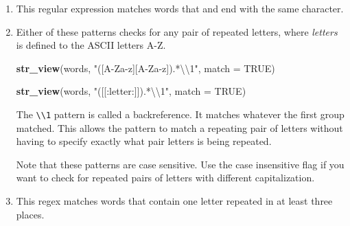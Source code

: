 \documentclass[]{book}
\newenvironment{Shaded}{\begin{snugshade}}{\end{snugshade}}
\newcommand{\CharTok}[1]{\textcolor[rgb]{0.31,0.60,0.02}{#1}}
\newcommand{\DataTypeTok}[1]{\textcolor[rgb]{0.13,0.29,0.53}{#1}}
\newcommand{\KeywordTok}[1]{\textcolor[rgb]{0.13,0.29,0.53}{\textbf{#1}}}
\newcommand{\NormalTok}[1]{#1}
\newcommand{\OperatorTok}[1]{\textcolor[rgb]{0.81,0.36,0.00}{\textbf{#1}}}
\newcommand{\OtherTok}[1]{\textcolor[rgb]{0.56,0.35,0.01}{#1}}
\newcommand{\StringTok}[1]{\textcolor[rgb]{0.31,0.60,0.02}{#1}}
\theoremstyle{plain}
\theoremstyle{remark}
\begin{document}
\begin{enumerate}
\def\labelenumi{\arabic{enumi}.}
\item
  This regular expression matches words that and end with the same
  character.

\begin{Shaded}
\end{Shaded}
\item
  Either of these patterns checks for any pair of repeated letters,
  where \emph{letters} is defined to the ASCII letters A-Z.

\begin{Shaded}
\begin{Highlighting}[]
\KeywordTok{str_view}\NormalTok{(words, }\StringTok{"([A-Za-z][A-Za-z]).*}\CharTok{\textbackslash{}\textbackslash{}}\StringTok{1"}\NormalTok{, }\DataTypeTok{match =} \OtherTok{TRUE}\NormalTok{)}
\end{Highlighting}
\end{Shaded}

\begin{Shaded}
\begin{Highlighting}[]
\KeywordTok{str_view}\NormalTok{(words, }\StringTok{"([[:letter:]]).*}\CharTok{\textbackslash{}\textbackslash{}}\StringTok{1"}\NormalTok{, }\DataTypeTok{match =} \OtherTok{TRUE}\NormalTok{)}
\end{Highlighting}
\end{Shaded}

  The \texttt{\textbackslash{}\textbackslash{}1} pattern is called a
  backreference. It matches whatever the first group matched. This
  allows the pattern to match a repeating pair of letters without having
  to specify exactly what pair letters is being repeated.

  Note that these patterns are case sensitive. Use the case insensitive
  flag if you want to check for repeated pairs of letters with different
  capitalization.
\item
  This regex matches words that contain one letter repeated in at least
  three places.


\end{enumerate}
\end{document}
